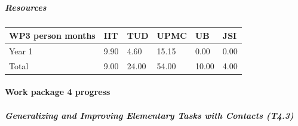 \documentclass[12pt,a4paper,twoside]{article}
\begin{document}

\subparagraph{Resources}

\begin{center}
\begin{tabular}{|C{1.5cm}|C{1.5cm}|C{1.5cm}|C{2cm}|C{2cm}|C{2cm}|}
\hline
\footnotesize \textbf{WP3 person months}& \footnotesize \textbf{IIT}&\footnotesize \textbf{TUD}&\footnotesize \textbf{UPMC}& \footnotesize \textbf{UB} &\footnotesize \textbf{JSI}\\ \hline
\footnotesize Year 1 &  9.90 & 4.60 & 15.15 & 0.00 & 0.00      \\  \hline
\footnotesize Total &  9.00	 & 24.00 & 54.00 & 10.00 & 4.00 \\ \hline
\end{tabular}
\end{center}

\paragraph{Work package 4 progress}

\subparagraph{Generalizing and Improving Elementary Tasks with Contacts (T4.3)}
\end{document}
